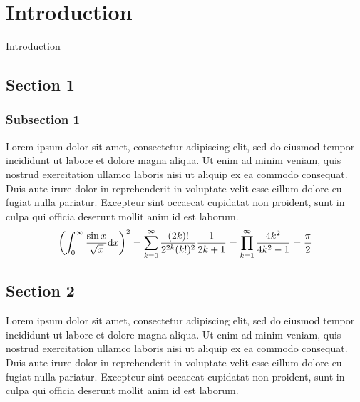 



\chapter{Introduction}
Introduction

\section{Section 1}
\subsection{Subsection 1}
Lorem ipsum dolor sit amet, consectetur adipiscing elit,
sed do eiusmod tempor incididunt ut labore et dolore magna aliqua.
Ut enim ad minim veniam,
quis nostrud exercitation ullamco laboris nisi ut aliquip ex ea commodo consequat.
Duis aute irure dolor in reprehenderit in voluptate velit esse cillum dolore eu fugiat nulla pariatur.
Excepteur sint occaecat cupidatat non proident,
sunt in culpa qui officia deserunt mollit anim id est laborum\cite{PaperSample1}.
\begin{equation}
\qty( \int_{0}^{\infty} \frac{\sin x}{\sqrt{x}} \dd x )^2
    =
    \sum_{ k = 0 }^{ \infty }
        \frac{ (2k)! }{ 2^{2k} (k!)^2 } \frac{1}{ 2k+1 }
    =
    \prod_{ k = 1 }^{ \infty }
        \frac{ 4k^2 }{ 4k^2 - 1 }
    = \frac{ \pi }{ 2 }
\end{equation}



\clearpage


\section{Section 2}
Lorem ipsum dolor sit amet, consectetur adipiscing elit,
sed do eiusmod tempor incididunt ut labore et dolore magna aliqua.
Ut enim ad minim veniam,
quis nostrud exercitation ullamco laboris nisi ut aliquip ex ea commodo consequat.
Duis aute irure dolor in reprehenderit in voluptate velit esse cillum dolore eu fugiat nulla pariatur.
Excepteur sint occaecat cupidatat non proident,
sunt in culpa qui officia deserunt mollit anim id est laborum\cites{PaperSample1,PaperSample2,PaperSample3}.

